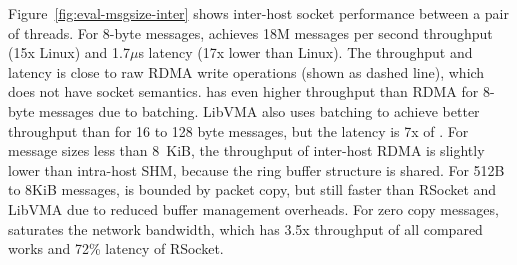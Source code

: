 Figure~\ref{fig:eval-msgsize-inter} shows inter-host socket performance between a pair of threads.
For 8-byte messages, \sys achieves 18M messages per second throughput (15x Linux) and 1.7$\mu$s latency (17x lower than Linux).
The throughput and latency is close to raw RDMA write operations (shown as dashed line), which does not have socket semantics.
\sys{} has even higher throughput than RDMA for 8-byte messages due to batching.
LibVMA also uses batching to achieve better throughput than \sys{} for 16 to 128 byte messages, but the latency is 7x of \sys{}.
For message sizes less than 8~KiB, the throughput of inter-host RDMA is  slightly lower than intra-host SHM, because the ring buffer structure is shared.
For 512B to 8KiB messages, \sys{} is bounded by packet copy, but still faster than RSocket and LibVMA due to reduced buffer management overheads.
For zero copy messages, \sys{} saturates the network bandwidth, which has 3.5x throughput of all compared works and 72\% latency of RSocket.



